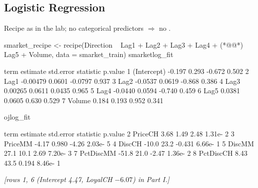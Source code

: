 \subsection{Logistic Regression}
%
Recipe as in the  lab; no categorical predictors $\Rightarrow$ no .
\begin{rcode}
smarket_recipe <- recipe(Direction ~ Lag1 + Lag2 + Lag3 + Lag4 +   (*@@*)
                           Lag5 + Volume, data = smarket_train)
smarketlog_fit %
\end{rcode}
\begin{routput}
  term        estimate std.error statistic p.value
1 (Intercept) -0.197      0.293    -0.672    0.502
2 Lag1        -0.00479    0.0601   -0.0797   0.937
3 Lag2        -0.0537     0.0619   -0.868    0.386
4 Lag3         0.00265    0.0611    0.0435   0.965
5 Lag4        -0.0440     0.0594   -0.740    0.459
6 Lag5         0.0381     0.0605    0.630    0.529
7 Volume       0.184      0.193     0.952    0.341
\end{routput}
%
\begin{rcode}
ojlog_fit %
\end{rcode}
\begin{routput}
  term        estimate std.error statistic  p.value
2 PriceCH         3.68     1.49      2.48  1.31e- 2
3 PriceMM        -4.17     0.980    -4.26  2.03e- 5
4 DiscCH        -10.0     23.2      -0.431 6.66e- 1
5 DiscMM         27.1     10.1       2.69  7.20e- 3
7 PctDiscMM     -51.8     21.0      -2.47  1.36e- 2
8 PctDiscCH       8.43    43.5       0.194 8.46e- 1
\end{routput}
{\color{figgray}\itshape [rows 1, 6 (Intercept 4.47, LoyalCH $-6.07$) in Part I.]}

